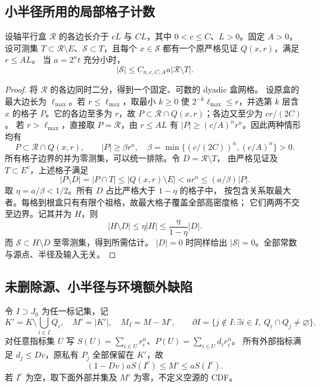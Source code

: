 \subsection{小半径所用的局部格子计数}

\begin{lemma}[局部 dyadic 计数]\label{lem:global-dyadic-small}
设轴平行盒 \(\mathcal R\) 的各边长介于 \(cL\) 与 \(CL\)，其中
\(0<c\le C\)、\(L>0\)。固定 \(A>0\)，设可测集
\(T\subset\mathcal R\setminus E\)、\(\mathcal S\subset T\)，且每个
\(x\in\mathcal S\) 都有一个原严格见证 \(Q(x,r)\)，满足 \(r\le AL\)。
当 \(a=2^nt\) 充分小时，
\begin{equation}\label{eq:global-dyadic-small}
 |\mathcal S|\le C_{n,c,C,A}a|\mathcal R\setminus T|.
\end{equation}
\end{lemma}
\begin{proof}
将 \(\mathcal R\) 的各边同时二分，得到一个固定、可数的 dyadic 盒网格。
设原盒的最大边长为 \(\ell_{\max}\)。若 \(r\le\ell_{\max}\)，取最小
\(k\ge0\) 使 \(2^{-k}\ell_{\max}\le r\)，并选第 \(k\) 层含 \(x\) 的格子
\(P\)。它的各边至多为 \(r\)，故
\(P\subset\mathcal R\cap Q(x,r)\)；各边又至少为 \(cr/(2C)\)。
若 \(r>\ell_{\max}\)，直接取 \(P=\mathcal R\)，由 \(r\le AL\) 有
\(|P|\ge(c/A)^nr^n\)。因此两种情形均有
\[
 P\subset\mathcal R\cap Q(x,r),\qquad |P|\ge\beta r^n,
 \quad\beta=\min\{(c/(2C))^n,(c/A)^n\}>0.
\]
所有格子边界的并为零测集，可以统一排除。令 \(D=\mathcal R\setminus T\)，
由严格见证及 \(T\subset E^c\)，上述格子满足
\[
 |P\setminus D|=|P\cap T|\le|Q(x,r)\setminus E|
 <ar^n\le(a/\beta)|P|.
\]
取 \(\eta=a/\beta<1/2\)。所有 \(D\) 占比严格大于 \(1-\eta\) 的格子中，
按包含关系取最大者。每格到根盒只有有限个祖格，故最大格子覆盖全部高密度格；
它们两两不交至边界。记其并为 \(H\)，则
\[
 |H\setminus D|\le\eta|H|\le\frac{\eta}{1-\eta}|D|.
\]
而 \(\mathcal S\subset H\setminus D\) 至零测集，得到所需估计。
\(|D|=0\) 时同样给出 \(|\mathcal S|=0\)。全部常数与源点、半径及输入无关。
\end{proof}

\subsection{未删除源、小半径与环境额外缺陷}

令 \(I\supset J_0\) 为任一标记集，记
\[
 K'=K\setminus\bigcup_{i\in I}Q_i,\quad M'=|K'|,\quad M_I=M-M',
 \qquad
 \partial I=\{j\notin I:\exists i\in I,\ Q_i\cap Q_j\ne\varnothing\}.
\]
对任意指标集 \(U\) 写
\(S(U)=\sum_{i\in U}r_i^n\)、\(P(U)=\sum_{i\in U}d_ir_i^n\)。
所有外部指标满足 \(d_j\le Dv\)，原私有 \(P_j\) 全部保留在 \(K'\)，故
\begin{equation}\label{eq:global-exterior-mass}
 (1-Dv)aS(I^c)\le M'\le aS(I^c).
\end{equation}
若 \(I^c\) 为空，取下面外部并集及 \(M'\) 为零，不定义空源的 CDF。

